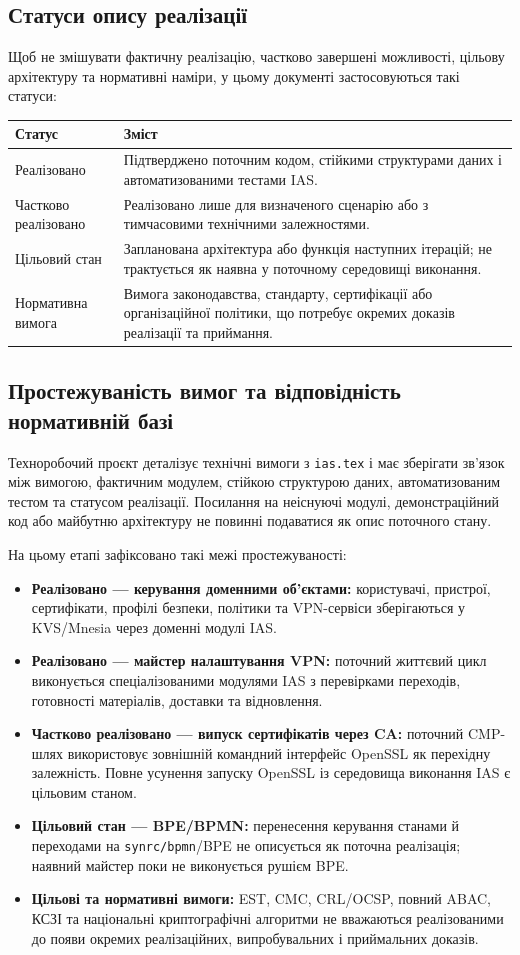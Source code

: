 \documentclass{article}
\begin{document}
\subsection{Статуси опису реалізації}
Щоб не змішувати фактичну реалізацію, частково завершені можливості, цільову архітектуру та нормативні наміри, у цьому документі застосовуються такі статуси:
\begin{longtable}{p{}p{}}
\toprule
\textbf{Статус} & \textbf{Зміст} \\
\midrule
Реалізовано & Підтверджено поточним кодом, стійкими структурами даних і автоматизованими тестами IAS. \\
Частково реалізовано & Реалізовано лише для визначеного сценарію або з тимчасовими технічними залежностями. \\
Цільовий стан & Запланована архітектура або функція наступних ітерацій; не трактується як наявна у поточному середовищі виконання. \\
Нормативна вимога & Вимога законодавства, стандарту, сертифікації або організаційної політики, що потребує окремих доказів реалізації та приймання. \\
\bottomrule
\end{longtable}

\subsection{Простежуваність вимог та відповідність нормативній базі}
Техноробочий проєкт деталізує технічні вимоги з \texttt{ias.tex} і має зберігати зв'язок між вимогою, фактичним модулем, стійкою структурою даних, автоматизованим тестом та статусом реалізації. Посилання на неіснуючі модулі, демонстраційний код або майбутню архітектуру не повинні подаватися як опис поточного стану.

На цьому етапі зафіксовано такі межі простежуваності:
\begin{itemize}
    \item \textbf{Реалізовано --- керування доменними об'єктами:} користувачі, пристрої, сертифікати, профілі безпеки, політики та VPN-сервіси зберігаються у KVS/Mnesia через доменні модулі IAS.
    \item \textbf{Реалізовано --- майстер налаштування VPN:} поточний життєвий цикл виконується спеціалізованими модулями IAS з перевірками переходів, готовності матеріалів, доставки та відновлення.
    \item \textbf{Частково реалізовано --- випуск сертифікатів через CA:} поточний CMP-шлях використовує зовнішній командний інтерфейс OpenSSL як перехідну залежність. Повне усунення запуску OpenSSL із середовища виконання IAS є цільовим станом.
    \item \textbf{Цільовий стан --- BPE/BPMN:} перенесення керування станами й переходами на \texttt{synrc/bpmn}/BPE не описується як поточна реалізація; наявний майстер поки не виконується рушієм BPE.
    \item \textbf{Цільові та нормативні вимоги:} EST, CMC, CRL/OCSP, повний ABAC, КСЗІ та національні криптографічні алгоритми не вважаються реалізованими до появи окремих реалізаційних, випробувальних і приймальних доказів.
\end{itemize}
\end{document}
